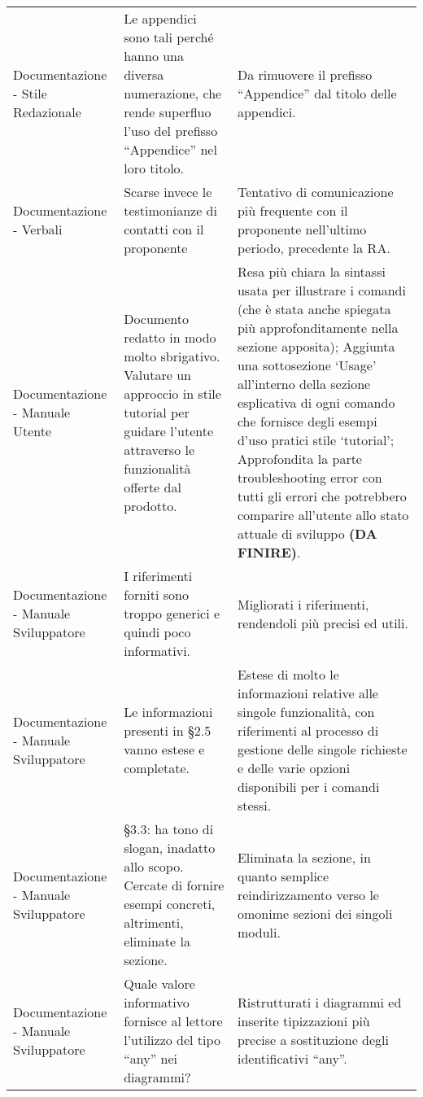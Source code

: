 \begin{longtable}{ 
					>{\centering}p{} 
					>{\centering}p{}
					>{\centering\arraybackslash}p{}}
				
				Documentazione - Stile Redazionale
				&
				Le appendici sono tali perché hanno una diversa numerazione, che rende superfluo l’uso del prefisso “Appendice” nel loro titolo.
				&
				Da rimuovere il prefisso “Appendice” dal titolo delle appendici.
				\\
				
				
				Documentazione - Verbali
				&
				Scarse invece le testimonianze di contatti con il proponente 
				&
				Tentativo di comunicazione più frequente con il proponente nell’ultimo periodo, precedente la RA.
				\\
				
				
				Documentazione - Manuale Utente
				&
				Documento redatto in modo molto sbrigativo. Valutare un approccio in stile tutorial per guidare l’utente attraverso le funzionalità offerte dal prodotto. 
				&
				Resa più chiara la sintassi usata per illustrare i comandi (che è stata anche spiegata più approfonditamente nella sezione apposita);
				Aggiunta una sottosezione ‘Usage’ all’interno della sezione esplicativa di ogni comando che fornisce degli esempi d’uso pratici stile ‘tutorial’;
				Approfondita la parte troubleshooting error con tutti gli errori che potrebbero comparire all’utente allo stato attuale di sviluppo \textbf{(DA FINIRE)}.\\
				
				
				Documentazione - Manuale Sviluppatore
				&
				I riferimenti forniti sono troppo generici e quindi poco informativi.
				&
				Migliorati i riferimenti, rendendoli più precisi ed utili.
				\\
				
				
				Documentazione - Manuale Sviluppatore
				&
				Le informazioni presenti in §2.5 vanno estese e completate.
				&
				Estese di molto le informazioni relative alle singole funzionalità, con riferimenti al processo di gestione delle singole richieste e delle varie opzioni disponibili per i comandi stessi. 
				\\
				
				
				Documentazione - Manuale Sviluppatore
				&
				§3.3: ha tono di slogan, inadatto allo scopo. Cercate di fornire esempi concreti, altrimenti, eliminate la sezione.
				&
				Eliminata la sezione, in quanto semplice reindirizzamento verso le omonime sezioni dei singoli moduli. 
				\\
				
				
				Documentazione - Manuale Sviluppatore
				&
				Quale valore informativo fornisce al lettore l’utilizzo del tipo “any” nei diagrammi? 
				&
				Ristrutturati i diagrammi ed inserite tipizzazioni più precise a sostituzione degli identificativi “any”.
				\\
				

\end{longtable}

